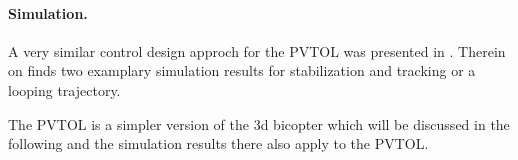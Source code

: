 \paragraph{Simulation.}
A very similar control design approch for the PVTOL was presented in \cite{Konz:AT}.
Therein on finds two examplary simulation results for stabilization and tracking or a looping trajectory.

The PVTOL is a simpler version of the 3d bicopter which will be discussed in the following and the simulation results there also apply to the PVTOL.


